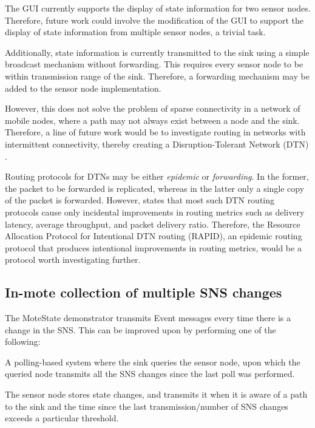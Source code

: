 \documentclass{sig-alternate-10pt}
\begin{document}
The GUI currently supports the display of state information for two sensor 
nodes. Therefore, future work could involve the modification of the GUI to 
support the display of state information from multiple sensor nodes, a trivial 
task.

Additionally, state information is currently transmitted to the sink using a 
simple broadcast mechanism without forwarding. This requires every sensor node 
to be within transmission range of the sink. Therefore, a forwarding mechanism 
may be added to the sensor node implementation.

However, this does not solve the problem of sparse connectivity in a network of 
mobile nodes, where a path may not always exist between a node and the sink. 
Therefore, a line of future work would be 
to investigate routing in networks with intermittent connectivity, thereby 
creating a Disruption-Tolerant Network (DTN) \cite{dtnResourceAllocation:2007}.

Routing protocols for DTNs may be either \emph{epidemic} or \emph{forwarding}. 
In the former, the packet to be forwarded is replicated, whereas in the latter 
only a single copy of the packet is forwarded. However, 
\cite{dtnResourceAllocation:2007} states that most such DTN routing protocols 
cause only incidental improvements in routing metrics such as delivery latency, 
average throughput, and packet delivery ratio. Therefore, the Resource 
Allocation Protocol for Intentional DTN routing (RAPID), an epidemic routing 
protocol that produces intentional improvements in routing metrics, would be a 
protocol worth investigating further.

\subsection{In-mote collection of multiple SNS changes}

The MoteState demonstrator transmits Event messages every time there is a change in the SNS. This can be improved upon by performing one of the following: 
\begin{compactitem}
\item A polling-based system where the sink queries the sensor node, upon which the queried node transmits all the SNS changes since the last poll was performed.
\item The sensor node stores state changes, and transmits it when it is aware of a path to the sink and the time since the last transmission/number of SNS changes exceeds a particular threshold.
\end{compactitem}
\end{document}
